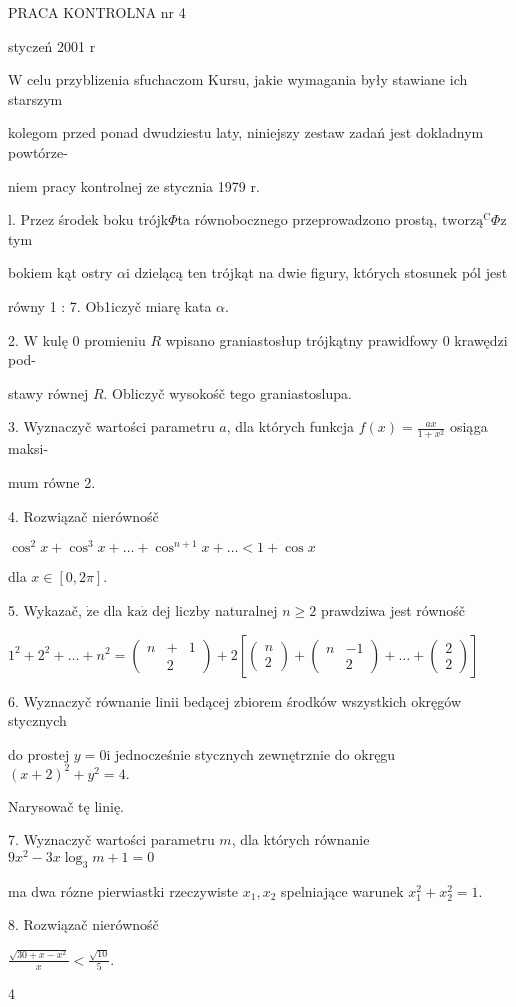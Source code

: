 \documentclass[a4paper,12pt]{article}
\begin{document}
PRACA KONTROLNA nr 4

styczeń 2001 $\mathrm{r}$

$\mathrm{W}$ celu przyblizenia sfuchaczom Kursu, jakie wymagania były stawiane ich starszym

kolegom przed ponad dwudziestu laty, niniejszy zestaw zadań jest dokladnym powtórze-

niem pracy kontrolnej ze stycznia 1979 $\mathrm{r}.$

l. Przez środek boku trójk$\Phi$ta równobocznego przeprowadzono prostą, $\mathrm{t}\mathrm{w}\mathrm{o}\mathrm{r}\mathrm{z}\text{ą}^{\mathrm{C}}\Phi \mathrm{z}$ tym

bokiem kąt ostry $\alpha \mathrm{i}$ dzielącą ten trójkąt na dwie figury, których stosunek pól jest

równy 1 : 7. Ob1iczyč miarę kata $\alpha.$

2. $\mathrm{W}$ kulę $0$ promieniu $R$ wpisano graniastosłup trójkątny prawidfowy $0$ krawędzi pod-

stawy równej $R$. Obliczyč wysokośč tego graniastoslupa.

3. Wyznaczyč wartości parametru $a$, dla których funkcja $f(x) = \displaystyle \frac{ax}{1+x^{2}}$ osiąga maksi-

mum równe 2.

4. Rozwiązač nierównośč

$\cos^{2}x+\cos^{3}x+\ldots+\cos^{n+1}x+\ldots<1+\cos x$

dla $x\in[0,2\pi].$

5. Wykazač, $\dot{\mathrm{z}}\mathrm{e}$ dla $\mathrm{k}\mathrm{a}\dot{\mathrm{z}}$ dej liczby naturalnej $n\geq 2$ prawdziwa jest równośč

$1^{2}+2^{2}+\ldots+n^{2}= \left(\begin{array}{lll}
n & + & 1\\
 & 2 & 
\end{array}\right)+2[\left(\begin{array}{l}
n\\
2
\end{array}\right)+\left(\begin{array}{ll}
n & -1\\
 & 2
\end{array}\right)+\ldots+ \left(\begin{array}{l}
2\\
2
\end{array}\right)]$

6. Wyznaczyč równanie linii bedącej zbiorem środków wszystkich okręgów stycznych

do prostej $y=0\mathrm{i}$ jednocześnie stycznych zewnętrznie do okręgu $(x+2)^{2}+y^{2}=4.$

Narysowač tę linię.

7. Wyznaczyč wartości parametru $m$, dla których równanie $9x^{2}-3x\log_{3}m+1 =0$

ma dwa rózne pierwiastki rzeczywiste $x_{1}, x_{2}$ spelniające warunek $x_{1}^{2}+x_{2}^{2}=1.$

8. Rozwiązač nierównośč

$\displaystyle \frac{\sqrt{30+x-x^{2}}}{x}<\frac{\sqrt{10}}{5}.$

4
\end{document}
